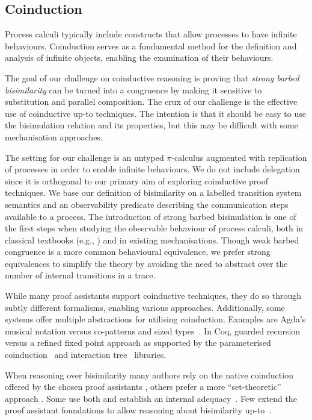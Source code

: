 \documentclass[runningheads]{llncs}
\begin{document}
\subsection{Coinduction}

Process calculi typically include constructs that allow processes to
have infinite behaviours.  Coinduction serves as a fundamental method
for the definition and analysis of infinite objects, enabling the
examination of their behaviours.

The goal of our challenge on coinductive reasoning is proving that
\emph{strong barbed bisimilarity} can be turned into a congruence by making
it sensitive to substitution and parallel composition. The crux of our
challenge is the effective use of coinductive up-to techniques.  The
intention is that it should be easy to use the bisimulation relation
and its properties, but this may be difficult with some mechanisation
approaches.

The setting for our challenge is an untyped \(\pi\)-calculus augmented with
replication of processes in order to enable infinite behaviours.  We do not
include delegation since it is orthogonal to our
primary aim of exploring coinductive proof techniques.  We base our
definition of bisimilarity on a labelled transition system semantics
and an observability predicate describing the communication steps
available to a process.  The introduction of strong barbed
bisimulation is one of the first steps when studying the observable
behaviour of process calculi, both in classical textbooks (e.g.,
\cite{picalcbook}) and in existing mechanisations.  Though weak barbed
congruence is a more common behavioural equivalence, we prefer strong
equivalences to simplify the theory by avoiding the need to abstract
over the number of internal transitions in a trace.

While many proof assistants support coinductive techniques, they do so
through subtly different formalisms, enabling various
approaches. Additionally, some systems offer multiple abstractions for
utilising coinduction. Examples are Agda's musical notation versus  co-patterns and sized types~\cite{Abel2013}. In Coq, guarded recursion versus a refined fixed point approach as supported by the parameterised coinduction~\cite{Hur2013}
and interaction tree~\cite{Xia2019} libraries.

When reasoning over bisimilarity many authors rely on the native
 coinduction offered by the chosen proof assistants
\cite{Bengtson2016,Kahsai2008,Thiemann2019,Gay2020}, others prefer a
more ``set-theoretic'' approach
\cite{Hirschkoff1997,Bengtson2009,Maksimovic2015,Pohjola2022}. Some
use both and establish an internal adequacy~\cite{Honsell2001}. Few
extend the proof assistant foundations to allow \eg reasoning about
bisimilarity up-to~\cite{ChaudhuriCM15}.
\end{document}
